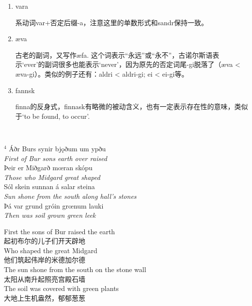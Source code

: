 \begin{grammar*}{}
    \begin{enumerate}[leftmargin=*]
        \item vara

              系动词var+否定后缀-a，注意这里的单数形式和sandr保持一致。

        \item æva

              古老的副词，又写作æfa. 这个词表示“永远”或“永不”，古诺尔斯语表示`ever'的副词很多也能表示`never'，因为原先的否定词尾-gi脱落了（æva < æva-gi）。类似的例子还有：aldri < aldri-gi; ei < ei-gi等。

        \item fannsk

              finna的反身式，finnask有略微的被动含义，也有一定表示存在性的意味，类似于`to be found, to occur'.

    \end{enumerate}
\end{grammar*}
\hspace*{\fill}\\ %
\begin{paracol}{2}
    \noindent
    $^4 $ Áðr Burs synir bjǫðum um ypðu\\
    \textit{First of Bur sons earth over raised}\\
    Þeir er Miðgarð mœran skópu\\
    \textit{Those who Midgard great shaped}\\
    Sól skein sunnan á salar steina\\
    \textit{Sun shone from the south along hall's stones}\\
    Þá var grund gróin grœnum lauki\\
    \textit{Then was soil grown green leek}\\
    \switchcolumn

    \noindent
    First the sons of Bur raised the earth\\
    起初布尔的儿子们开天辟地\\
    Who shaped the great Midgard\\
    他们筑起伟岸的米德加尔德\\
    The sun shone from the south on the stone wall\\
    太阳从南升起照亮宫殿石墙\\
    The soil was covered with green plants\\
    大地上生机盎然，郁郁葱葱\\

\end{paracol}

